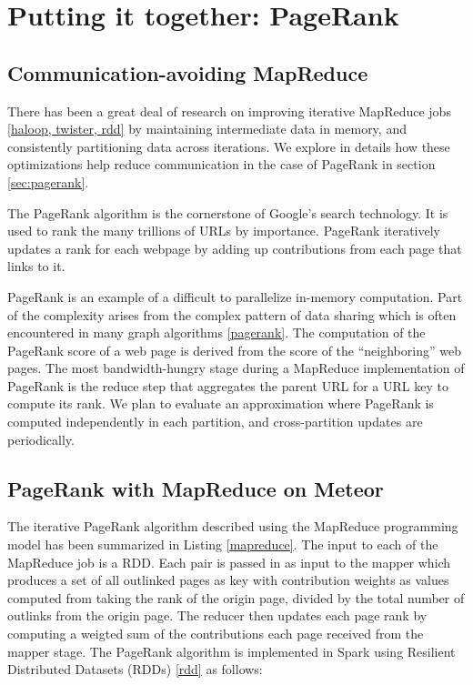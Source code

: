 \section{Putting it together: PageRank}
\label{sec: pagerank}


\subsection{Communication-avoiding MapReduce}

There has been a great deal of research on improving iterative MapReduce jobs \ref{haloop, twister, rdd} by maintaining intermediate data in memory, and consistently partitioning data across iterations. We explore in details how these optimizations help reduce communication in the case of PageRank in section \ref{sec:pagerank}.


The PageRank algorithm is the cornerstone of Google's search technology\cite{pagerank}. It is used to rank the many trillions of URLs by importance. PageRank iteratively updates a rank for each webpage by adding up contributions from each page that links to it. 

PageRank is an example of a difficult to parallelize in-memory computation. Part of the complexity arises from the complex pattern of data sharing which is often encountered in many graph algorithms \ref{pagerank}. The computation of the PageRank score of a web page is derived from the score of the ``neighboring'' web pages. The most bandwidth-hungry stage during a MapReduce implementation of PageRank is the reduce step that aggregates the parent URL for a URL key to compute its rank. We plan to evaluate an approximation where PageRank is computed independently in each partition, and cross-partition updates are periodically.

\subsection{PageRank with MapReduce on Meteor}

The iterative PageRank algorithm described using the MapReduce programming model has been summarized in Listing \ref{mapreduce}. The input to each of the MapReduce job is a  RDD. Each pair is passed in as input to the mapper which produces a set of all outlinked pages as key with contribution weights as values computed from taking the rank of the origin page, divided by the total number of outlinks from the origin page. The reducer then updates each page rank by computing a weigted sum of the contributions each page received from the mapper stage. The PageRank algorithm is implemented in Spark using Resilient Distributed Datasets (RDDs) \ref{rdd} as follows:

